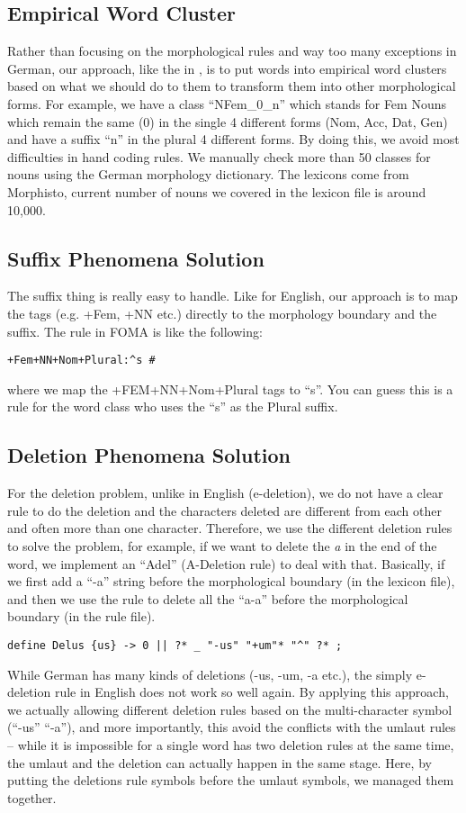 \documentclass[11pt,letterpaper]{article}
\begin{document}
\subsection{Empirical Word Cluster}
Rather than focusing on the morphological rules and way too many exceptions in German, our approach, like the in \cite{sch04}, is to put words into empirical word clusters based on what we should do to them to transform them into other morphological forms. For example, we have a class ``NFem\_0\_n'' which stands for Fem Nouns which remain the same (0) in the single 4 different forms (Nom, Acc, Dat, Gen) and have a suffix ``n'' in the plural 4 different forms. By doing this, we avoid most difficulties in hand coding rules. We manually check more than 50 classes for nouns using the German morphology dictionary. The lexicons come from Morphisto, current number of nouns we covered in the lexicon file is around 10,000.
\subsection{Suffix Phenomena Solution}
The suffix thing is really easy to handle. Like for English, our approach is to map the tags (e.g. +Fem, +NN etc.) directly to the morphology boundary and the suffix. The rule in FOMA is like the following:
\begin{verbatim}
+Fem+NN+Nom+Plural:^s #
\end{verbatim}
where we map the +FEM+NN+Nom+Plural tags to ``s''. You can guess this is a rule for the word class who uses the ``s'' as the Plural suffix.
\subsection{Deletion Phenomena Solution}
For the deletion problem, unlike in English (e-deletion), we do not have a clear rule to do the deletion and the characters deleted are different from each other and often more than one character. Therefore, we use the different deletion rules to solve the problem, for example, if we want to delete the \textit{a} in the end of the word, we implement an ``Adel'' (A-Deletion rule) to deal with that. Basically, if we first add a ``-a'' string before the morphological boundary (in the lexicon file), and then we use the rule to delete all the ``a-a'' before the morphological boundary (in the rule file).
\begin{verbatim}
define Delus {us} -> 0 || ?* _ "-us" "+um"* "^" ?* ;
\end{verbatim}
While German has many kinds of deletions (-us, -um, -a etc.), the simply e-deletion rule in English does not work so well again. By applying this approach, we actually allowing different deletion rules based on the multi-character symbol (``-us'' ``-a''), and more importantly, this avoid the conflicts with the umlaut rules -- while it is impossible for a single word has two deletion rules at the same time, the umlaut and the deletion can actually happen in the same stage. Here, by putting the deletions rule symbols before the umlaut symbols, we managed them together.
\end{document}
